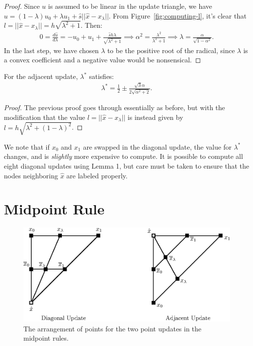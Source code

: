 \documentclass{article}
\begin{document}
\begin{proof}
  Since $u$ is assumed to be linear in the update triangle, we have
  $\hat{u} = (1 - \lambda) u_0 + \lambda u_1 + \hat{s} ||\hat{x} -
  x_\lambda||$. From Figure~\ref{fig:computing-l}, it's clear that
  $l = ||\hat{x} - x_\lambda|| = h \sqrt{\lambda^2 + 1}$. Then:
  \begin{align*}
    0 = \frac{d \hat{u}}{d \lambda} = -u_0 + u_1 + \frac{\hat{s} h \lambda}{\sqrt{\lambda^2 + 1}} \implies \alpha^2 = \frac{\lambda^2}{\lambda^2 + 1} \implies \lambda = \frac{\alpha}{\sqrt{1 - \alpha^2}}.
  \end{align*}
  In the last step, we have chosen $\lambda$ to be the positive root
  of the radical, since $\lambda$ is a convex coefficient and a
  negative value would be nonsensical.
\end{proof}

\begin{lemma}\label{lemma:rhr-adjacent-update}
  For the adjacent update, $\lambda^*$ satisfies:
  \begin{align*}
    \lambda^* = \frac{1}{2} \pm \frac{\sqrt{3} \alpha}{2 \sqrt{\alpha^2 + 2}}.
  \end{align*}
\end{lemma}

\begin{proof}
  The previous proof goes through essentially as before, but with the
  modification that the value $l = ||\hat{x} - x_\lambda||$ is instead
  given by $l = h \sqrt{\lambda^2 + (1 - \lambda)^2}$.
\end{proof}

We note that if $x_0$ and $x_1$ are swapped in the diagonal update,
the value for $\lambda^*$ changes, and is \emph{slightly} more
expensive to compute. It is possible to compute all eight diagonal
updates using Lemma 1, but care must be taken to ensure that the nodes
neighboring $\hat{x}$ are labeled properly.

\section{Midpoint Rule}

\begin{figure}[h]
  \centering
  \includegraphics{midpoint_update.eps}
  \caption{The arrangement of points for the two point updates in the
    midpoint rules.}\label{fig:midpoint-update}
\end{figure}
\end{document}
